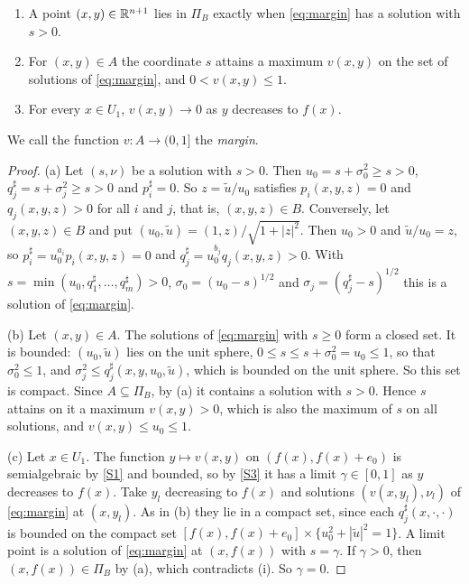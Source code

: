 \begin{lemma}[margin]\label{lem:margin}
\begin{enumerate}[label=\textup{(\alph*)}]
\item A point $(x,y)\in\mathbb{R}^{n+1}$ lies in $\Pi_B$ exactly when \eqref{eq:margin} has a solution with $s>0$.
\item For $(x,y)\in A$ the coordinate $s$ attains a maximum $v(x,y)$ on the set of solutions of \eqref{eq:margin}, and $0<v(x,y)\le1$.
\item For every $x\in U_1$, $v(x,y)\to0$ as $y$ decreases to $f(x)$.
\end{enumerate}
\end{lemma}

We call the function $v\colon A\to(0,1]$ the \emph{margin}.

\begin{proof}
(a) Let $(s,\nu)$ be a solution with $s>0$. Then $u_0=s+\sigma_0^2\ge s>0$, $q_j^\sharp=s+\sigma_j^2\ge s>0$ and $p_i^\sharp=0$. So $z=\tilde u/u_0$ satisfies $p_i(x,y,z)=0$ and $q_j(x,y,z)>0$ for all $i$ and $j$, that is, $(x,y,z)\in B$. Conversely, let $(x,y,z)\in B$ and put $(u_0,\tilde u)=(1,z)/\sqrt{1+|z|^2}$. Then $u_0>0$ and $\tilde u/u_0=z$, so $p_i^\sharp=u_0^{a_i}p_i(x,y,z)=0$ and $q_j^\sharp=u_0^{b_j}q_j(x,y,z)>0$. With $s=\min(u_0,q_1^\sharp,\dots,q_m^\sharp)>0$, $\sigma_0=(u_0-s)^{1/2}$ and $\sigma_j=(q_j^\sharp-s)^{1/2}$ this is a solution of \eqref{eq:margin}.

(b) Let $(x,y)\in A$. The solutions of \eqref{eq:margin} with $s\ge0$ form a closed set. It is bounded: $(u_0,\tilde u)$ lies on the unit sphere, $0\le s\le s+\sigma_0^2=u_0\le1$, so that $\sigma_0^2\le1$, and $\sigma_j^2\le q_j^\sharp(x,y,u_0,\tilde u)$, which is bounded on the unit sphere. So this set is compact. Since $A\subseteq\Pi_B$, by (a) it contains a solution with $s>0$. Hence $s$ attains on it a maximum $v(x,y)>0$, which is also the maximum of $s$ on all solutions, and $v(x,y)\le u_0\le1$.

(c) Let $x\in U_1$. The function $y\mapsto v(x,y)$ on $(f(x),f(x)+e_0)$ is semialgebraic by \ref{S1} and bounded, so by \ref{S3} it has a limit $\gamma\in[0,1]$ as $y$ decreases to $f(x)$. Take $y_l$ decreasing to $f(x)$ and solutions $(v(x,y_l),\nu_l)$ of \eqref{eq:margin} at $(x,y_l)$. As in (b) they lie in a compact set, since each $q_j^\sharp(x,\cdot,\cdot)$ is bounded on the compact set $[f(x),f(x)+e_0]\times\{u_0^2+|\tilde u|^2=1\}$. A limit point is a solution of \eqref{eq:margin} at $(x,f(x))$ with $s=\gamma$. If $\gamma>0$, then $(x,f(x))\in\Pi_B$ by (a), which contradicts \textup{(i)}. So $\gamma=0$.
\end{proof}

